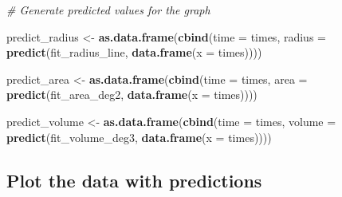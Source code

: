 \documentclass[]{article}
\newenvironment{Shaded}{\begin{snugshade}}{\end{snugshade}}
\newcommand{\CommentTok}[1]{\textcolor[rgb]{0.56,0.35,0.01}{\textit{#1}}}
\newcommand{\DataTypeTok}[1]{\textcolor[rgb]{0.13,0.29,0.53}{#1}}
\newcommand{\KeywordTok}[1]{\textcolor[rgb]{0.13,0.29,0.53}{\textbf{#1}}}
\newcommand{\NormalTok}[1]{#1}
\newcommand{\StringTok}[1]{\textcolor[rgb]{0.31,0.60,0.02}{#1}}
\begin{document}
\begin{Shaded}
\begin{Highlighting}[]
\CommentTok{# Generate predicted values for the graph}

\NormalTok{predict_radius <-}\StringTok{ }\KeywordTok{as.data.frame}\NormalTok{(}\KeywordTok{cbind}\NormalTok{(}\DataTypeTok{time =}\NormalTok{ times, }\DataTypeTok{radius =} \KeywordTok{predict}\NormalTok{(fit_radius_line, }\KeywordTok{data.frame}\NormalTok{(}\DataTypeTok{x =}\NormalTok{ times))))}

\NormalTok{predict_area <-}\StringTok{ }\KeywordTok{as.data.frame}\NormalTok{(}\KeywordTok{cbind}\NormalTok{(}\DataTypeTok{time =}\NormalTok{ times, }\DataTypeTok{area =} \KeywordTok{predict}\NormalTok{(fit_area_deg2, }\KeywordTok{data.frame}\NormalTok{(}\DataTypeTok{x =}\NormalTok{ times))))}

\NormalTok{predict_volume <-}\StringTok{ }\KeywordTok{as.data.frame}\NormalTok{(}\KeywordTok{cbind}\NormalTok{(}\DataTypeTok{time =}\NormalTok{ times, }\DataTypeTok{volume =} \KeywordTok{predict}\NormalTok{(fit_volume_deg3, }\KeywordTok{data.frame}\NormalTok{(}\DataTypeTok{x =}\NormalTok{ times))))}
\end{Highlighting}
\end{Shaded}

\hypertarget{plot-the-data-with-predictions}{%
\subsection{Plot the data with
predictions}\label{plot-the-data-with-predictions}}
\end{document}
